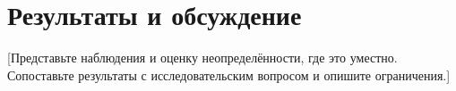 \section{Результаты и обсуждение}

[Представьте наблюдения и оценку неопределённости, где это уместно.
Сопоставьте результаты с исследовательским вопросом и опишите ограничения.]


